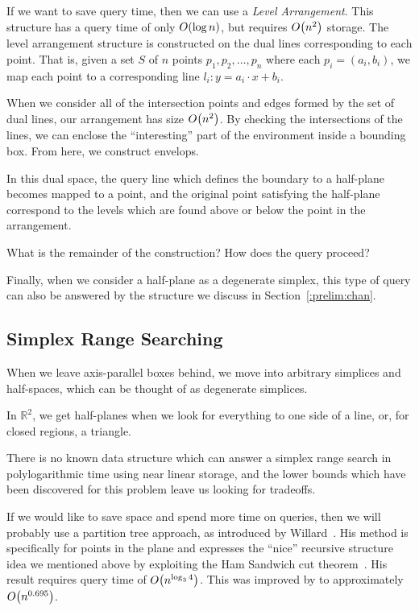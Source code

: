 If we want to save query time, then we can use a \emph{Level Arrangement}.  
This structure has a query time of only $O\!\left(\log{n}\right)$, but requires $O\!\left(n^2\right)$ storage.
The level arrangement structure is constructed on the dual lines corresponding to each point.
That is, given a set $S$ of $n$ points $p_1, p_2, \ldots, p_n$ where each $p_i = (a_i, b_i)$, we map each point to a corresponding line $l_i: y = a_i \cdot x + b_i$.

When we consider all of the intersection points and edges formed by the set of dual lines, our arrangement has size $O\!\left(n^2\right)$.
By checking the intersections of the lines, we can enclose the ``interesting'' part of the environment inside a bounding box.
From here, we construct envelops.

In this dual space, the query line which defines the boundary to a half-plane becomes mapped to a point, and the original point satisfying the half-plane correspond to the levels which are found above or below the point in the arrangement.

What is the remainder of the construction? How does the query proceed?

Finally, when we consider a half-plane as a degenerate simplex, this type of query can also be answered by the structure we discuss in Section~\ref{:prelim:chan}.


\subsection*{Simplex Range Searching}

When we leave axis-parallel boxes behind, we move into arbitrary simplices and half-spaces, which can be thought of as degenerate simplices.

In $\mathbb{R}^2$, we get half-planes when we look for everything to one side of a line, or, for closed regions, a triangle.

There is no known data structure which can answer a simplex range search in polylogarithmic time using near linear storage, and the lower bounds which have been discovered for this problem leave us looking for tradeoffs.\cite{Agarwal99}

If we would like to save space and spend more time on queries, then we will probably use a partition tree approach, as introduced by Willard~\cite{Willard82}. 
His method is specifically for points in the plane and expresses the ``nice'' recursive structure idea we mentioned above by exploiting the Ham Sandwich cut theorem~\cite{XXX}.
His result requires query time of $O\!\left(n^{\log_3{4}}\right)$.
This was improved by \cite{EW} to approximately $O\!\left(n^{0.695}\right)$.

